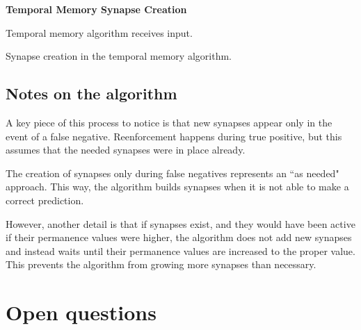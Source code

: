 \documentclass{article}
\begin{document}
\begin{algorithm}[H]
\SetAlgoLined
\textbf{Temporal Memory Synapse Creation}

Temporal memory algorithm receives input.

\caption{Synapse creation in the temporal memory algorithm.}
\end{algorithm}

\subsection*{Notes on the algorithm}
A key piece of this process to notice is that new synapses appear only in the event of a false negative. Reenforcement happens during true positive, but this assumes that the needed synapses were in place already.

The creation of synapses only during false negatives represents an ``as needed" approach. This way, the algorithm builds synapses when it is not able to make a correct prediction.

However, another detail is that if synapses exist, and they would have been active if their permanence values were higher, the algorithm does not add new synapses and instead waits until their permanence values are increased to the proper value. This prevents the algorithm from growing more synapses than necessary.

\section*{Open questions}  
\end{document}
